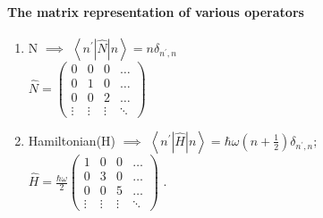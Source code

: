  \paragraph{The matrix representation of various operators}
 \begin{enumerate}
 	\item N $\implies$
 		$\left\langle n^{\prime}|\hat{N}| n\right\rangle=n \delta_{n^{\prime}, n}$ \\
 		$\hat{N}=\left(\begin{array}{cccc}
 			0 & 0 & 0 & \ldots \\
 			0 & 1 & 0 & \ldots \\
 			0 & 0 & 2 & \ldots \\
 			\vdots & \vdots & \vdots & \ddots
 		\end{array}\right)$
 	\item Hamiltonian(H) $\implies$
 	$\left\langle n^{\prime}|\hat{H}| n\right\rangle=\hbar \omega\left(n+\frac{1}{2}\right) \delta_{n^{\prime}, n} ;$ \\
 	$\hat{H}=\frac{\hbar \omega}{2}\left(\begin{array}{cccc}
 	1 & 0 & 0 & \ldots \\
 	0 & 3 & 0 & \ldots \\
 	0 & 0 & 5 & \ldots \\
 	\vdots & \vdots & \vdots & \ddots
 	\end{array}\right)$ .
 

\end{enumerate}
